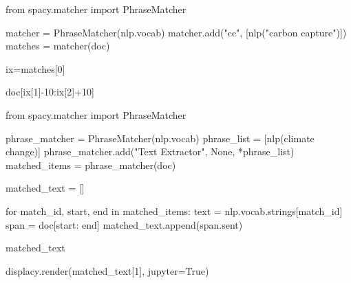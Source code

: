 \documentclass[
  letterpaper,
  DIV=11,
  numbers=noendperiod]{scrreprt}
\newenvironment{Shaded}{\begin{snugshade}}{\end{snugshade}}
\newcommand{\ControlFlowTok}[1]{\textcolor[rgb]{0.00,0.23,0.31}{#1}}
\newcommand{\DecValTok}[1]{\textcolor[rgb]{0.68,0.00,0.00}{#1}}
\newcommand{\ImportTok}[1]{\textcolor[rgb]{0.00,0.46,0.62}{#1}}
\newcommand{\KeywordTok}[1]{\textcolor[rgb]{0.00,0.23,0.31}{#1}}
\newcommand{\NormalTok}[1]{\textcolor[rgb]{0.00,0.23,0.31}{#1}}
\newcommand{\OperatorTok}[1]{\textcolor[rgb]{0.37,0.37,0.37}{#1}}
\newcommand{\StringTok}[1]{\textcolor[rgb]{0.13,0.47,0.30}{#1}}
\newcommand{\VariableTok}[1]{\textcolor[rgb]{0.07,0.07,0.07}{#1}}
\begin{document}
\begin{Shaded}
\begin{Highlighting}[]
\ImportTok{from}\NormalTok{ spacy.matcher }\ImportTok{import}\NormalTok{ PhraseMatcher}

\NormalTok{matcher }\OperatorTok{=}\NormalTok{ PhraseMatcher(nlp.vocab)}
\NormalTok{matcher.add(}\StringTok{"cc"}\NormalTok{, [nlp(}\StringTok{"carbon capture"}\NormalTok{)])}
\NormalTok{matches }\OperatorTok{=}\NormalTok{ matcher(doc)}

\NormalTok{ix}\OperatorTok{=}\NormalTok{matches[}\DecValTok{0}\NormalTok{]}

\NormalTok{doc[ix[}\DecValTok{1}\NormalTok{]}\OperatorTok{{-}}\DecValTok{10}\NormalTok{:ix[}\DecValTok{2}\NormalTok{]}\OperatorTok{+}\DecValTok{10}\NormalTok{]}
\end{Highlighting}
\end{Shaded}

\begin{Shaded}
\begin{Highlighting}[]
\ImportTok{from}\NormalTok{ spacy.matcher }\ImportTok{import}\NormalTok{ PhraseMatcher}

\NormalTok{phrase\_matcher }\OperatorTok{=}\NormalTok{ PhraseMatcher(nlp.vocab)}
\NormalTok{phrase\_list }\OperatorTok{=}\NormalTok{ [nlp(}\StringTok{\textquotesingle{}climate change\textquotesingle{}}\NormalTok{)]}
\NormalTok{phrase\_matcher.add(}\StringTok{"Text Extractor"}\NormalTok{, }\VariableTok{None}\NormalTok{, }\OperatorTok{*}\NormalTok{phrase\_list)}
\NormalTok{matched\_items }\OperatorTok{=}\NormalTok{ phrase\_matcher(doc)}

\NormalTok{matched\_text }\OperatorTok{=}\NormalTok{ []}

\ControlFlowTok{for}\NormalTok{ match\_id, start, end }\KeywordTok{in}\NormalTok{ matched\_items:}
\NormalTok{    text }\OperatorTok{=}\NormalTok{ nlp.vocab.strings[match\_id]}
\NormalTok{    span }\OperatorTok{=}\NormalTok{ doc[start: end]}
\NormalTok{    matched\_text.append(span.sent)}

\NormalTok{matched\_text}
\end{Highlighting}
\end{Shaded}

\begin{Shaded}
\begin{Highlighting}[]
\NormalTok{displacy.render(matched\_text[}\DecValTok{1}\NormalTok{], jupyter}\OperatorTok{=}\VariableTok{True}\NormalTok{)}
\end{Highlighting}
\end{Shaded}
\end{document}
